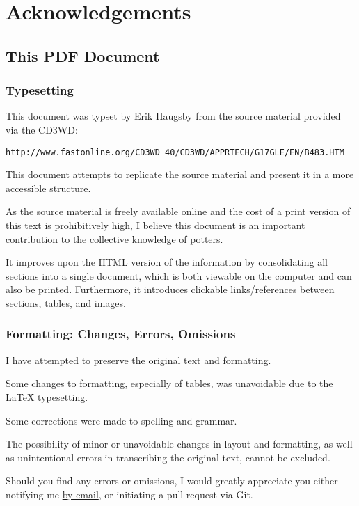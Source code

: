 \chapter*{Acknowledgements}
\section*{This PDF Document}
\subsection*{Typesetting}
This document was typset by Erik Haugsby from the source material provided 
via the CD3WD:
\begin{verbatim}
http://www.fastonline.org/CD3WD_40/CD3WD/APPRTECH/G17GLE/EN/B483.HTM
\end{verbatim}
This document attempts to replicate the source material and present it in a 
more accessible structure.

As the source material is freely available online and the cost of a print 
version of this text is prohibitively high, I believe this document is an 
important contribution to the collective knowledge of potters. 

It improves upon the HTML version of the information by consolidating all 
sections into a single document, which is both viewable on the computer and can 
also be printed. Furthermore, it introduces clickable links/references between 
sections, tables, and images.
\subsection*{Formatting: Changes, Errors, Omissions}
I have attempted to preserve the original text and formatting. 

Some changes to formatting, especially of tables, was unavoidable due to the 
LaTeX typesetting.

Some corrections were made to spelling and grammar.

The possibility of minor or unavoidable changes in layout and formatting, as 
well as unintentional errors in transcribing the original text, cannot be 
excluded.

Should you find any errors or omissions, I would greatly appreciate you either 
notifying me \href{mailto:e@erikhaugsby.com}{by email}, or initiating a pull 
request via Git. 

